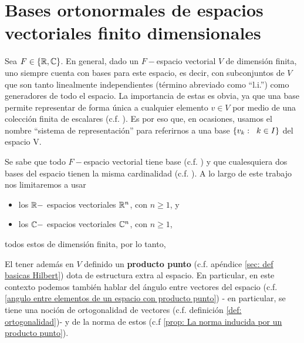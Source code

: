 \section{Bases ortonormales de espacios vectoriales finito dimensionales}

Sea $F \in \{ \mathbb{R}, \mathbb{C} \}$.  
En general, dado un $F-$espacio vectorial $V$ de dimensión finita,
uno siempre cuenta con 
bases para este espacio,
es decir, con subconjuntos de $V$ que son tanto linealmente
independientes (término abreviado como ``l.i.'') como generadores
de todo el espacio. La importancia de 
estas es obvia, ya que una base permite representar
de forma única a cualquier elemento $v \in V$ por medio
de una colección finita de escalares
(c.f. ). 
Es por eso que, en ocasiones,
usamos el nombre ``sistema de representación''
para referirnos a
una base $\{ v_{k} : \hspace{0.2cm} k \in I \}$
del espacio V.

Se sabe que todo $F-$espacio vectorial tiene
base (c.f. ) y que cualesquiera dos bases del espacio
tienen la misma cardinalidad (c.f. ).  
A lo largo de este trabajo
nos limitaremos a usar
\begin{itemize}
\item los $\mathbb{R}-$ espacios vectoriales $\mathbb{R}^{n}$, con $n \geq 1$, y
\item los $\mathbb{C}-$ espacios vectoriales $\mathbb{C}^{n}$, con $n \geq 1$, 
\end{itemize}
todos estos de dimensión finita, por lo tanto,

El tener además en $V$ definido un \textbf{producto punto}
(c.f. apéndice \ref{sec: def basicas Hilbert})
dota de estructura extra al espacio. En particular, 
en este contexto podemos también hablar del ángulo entre vectores
del espacio (c.f.
\ref{angulo entre elementos de un espacio con producto punto})
- en particular, se tiene una noción 
de ortogonalidad de vectores
(c.f. definición \ref{def: ortogonalidad})-
y de la norma de estos
(c.f \ref{prop: La norma inducida por un producto punto}).

